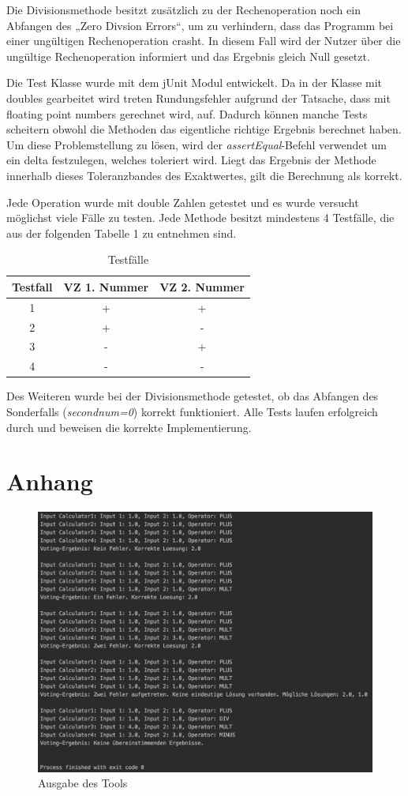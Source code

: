 Die Divisionsmethode besitzt zusätzlich zu der Rechenoperation noch ein Abfangen des „Zero Divsion Errors“, um zu verhindern, dass das Programm bei einer ungültigen Rechenoperation crasht. In diesem Fall wird der Nutzer über die ungültige Rechenoperation informiert und das Ergebnis gleich Null gesetzt.

Die Test Klasse wurde mit dem jUnit Modul entwickelt. Da in der Klasse mit doubles gearbeitet wird treten Rundungsfehler aufgrund der Tatsache, dass mit floating point numbers gerechnet wird, auf. Dadurch können manche Tests scheitern obwohl die Methoden das eigentliche richtige Ergebnis berechnet haben. Um diese Problemstellung zu lösen, wird der \textit{assertEqual}-Befehl verwendet um ein delta festzulegen, welches toleriert wird. Liegt das Ergebnis der Methode innerhalb dieses Toleranzbandes des Exaktwertes, gilt die Berechnung als korrekt.

Jede Operation wurde mit double Zahlen getestet und es wurde versucht möglichst viele Fälle zu testen. Jede Methode besitzt mindestens 4 Testfälle, die aus der folgenden Tabelle 1 zu entnehmen sind.

\begin{table}[H]
\centering
\begin{tabular}{c c c}
	Testfall & VZ 1. Nummer & VZ 2. Nummer\\
	\hline
	1 & + & +\\
	2 & + & -\\
	3 & - & +\\
	4 & - & -\\
\end{tabular}
\caption{Testfälle}
\end{table}

Des Weiteren wurde bei der Divisionsmethode getestet, ob das Abfangen des Sonderfalls (\textit{second\textunderscore num=0}) korrekt funktioniert. Alle Tests laufen erfolgreich durch und beweisen die korrekte Implementierung.

\chapter{Anhang}
\begin{figure}[H]
\centering
\includegraphics[width=1\textwidth]{images/tool_output.png}
\caption{Ausgabe des Tools}
\end{figure}
